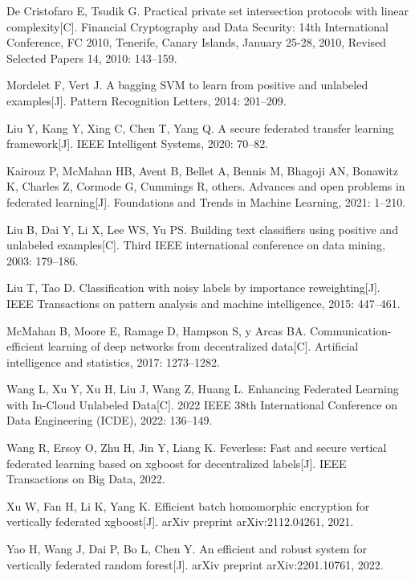 \begin{thebibliography}{200}
	De Cristofaro E, Tsudik G. Practical private set intersection protocols with linear complexity[C]. Financial Cryptography and Data Security: 14th International Conference, FC 2010, Tenerife, Canary Islands, January 25-28, 2010, Revised Selected Papers 14, 2010: 143--159.
	
	Mordelet F, Vert J. A bagging SVM to learn from positive and unlabeled examples[J]. Pattern Recognition Letters, 2014: 201--209.
	
	Liu Y, Kang Y, Xing C, Chen T, Yang Q. A secure federated transfer learning framework[J]. IEEE Intelligent Systems, 2020: 70--82.
	
	Kairouz P, McMahan HB, Avent B, Bellet A, Bennis M, Bhagoji AN, Bonawitz K, Charles Z, Cormode G, Cummings R, others. Advances and open problems in federated learning[J]. Foundations and Trends{\textregistered} in Machine Learning, 2021: 1--210.
	
	Liu B, Dai Y, Li X, Lee WS, Yu PS. Building text classifiers using positive and unlabeled examples[C]. Third IEEE international conference on data mining, 2003: 179--186.
	
	Liu T, Tao D. Classification with noisy labels by importance reweighting[J]. IEEE Transactions on pattern analysis and machine intelligence, 2015: 447--461.
	
	McMahan B, Moore E, Ramage D, Hampson S, y Arcas BA. Communication-efficient learning of deep networks from decentralized data[C]. Artificial intelligence and statistics, 2017: 1273--1282.
	
	Wang L, Xu Y, Xu H, Liu J, Wang Z, Huang L. Enhancing Federated Learning with In-Cloud Unlabeled Data[C]. 2022 IEEE 38th International Conference on Data Engineering (ICDE), 2022: 136--149.
	
	Wang R, Ersoy O, Zhu H, Jin Y, Liang K. Feverless: Fast and secure vertical federated learning based on xgboost for decentralized labels[J]. IEEE Transactions on Big Data, 2022.
	
	Xu W, Fan H, Li K, Yang K. Efficient batch homomorphic encryption for vertically federated xgboost[J]. arXiv preprint arXiv:2112.04261, 2021.
	
	Yao H, Wang J, Dai P, Bo L, Chen Y. An efficient and robust system for vertically federated random forest[J]. arXiv preprint arXiv:2201.10761, 2022.
	

\end{thebibliography}
